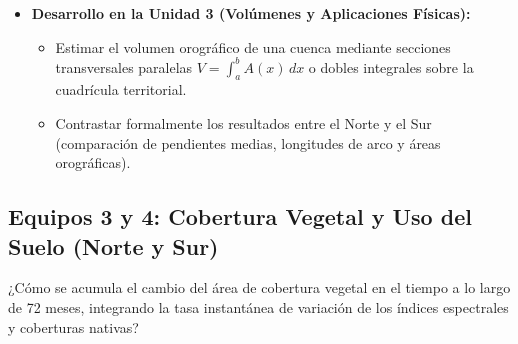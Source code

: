 \documentclass[11pt,a4paper]{article}
\begin{document}
\begin{itemize}[leftmargin=*,itemsep=1.5pt]
\begin{itemize}
\begin{equation*}
    \end{equation*}
    resolviendo la integral mediante sustitución trigonométrica o aproximación analítica avanzada.
    \item Formular un índice de accesibilidad continua combinando la pendiente instantánea $f'(x)$ y las distancias euclidianas.
  \end{itemize}
  \item \textbf{Desarrollo en la Unidad 3 (Volúmenes y Aplicaciones Físicas):}
  \begin{itemize}
    \item Estimar el volumen orográfico de una cuenca mediante secciones transversales paralelas $V = \int_{a}^{b} A(x)\,dx$ o dobles integrales sobre la cuadrícula territorial.
    \item Contrastar formalmente los resultados entre el Norte y el Sur (comparación de pendientes medias, longitudes de arco y áreas orográficas).
  \end{itemize}
\end{itemize}

\subsection{Equipos 3 y 4: Cobertura Vegetal y Uso del Suelo (Norte y Sur)}
\begin{guidelinebox}[title=Pregunta Guía Central]
¿Cómo se acumula el cambio del área de cobertura vegetal en el tiempo a lo largo de 72 meses, integrando la tasa instantánea de variación de los índices espectrales y coberturas nativas?
\end{guidelinebox}
\end{document}
